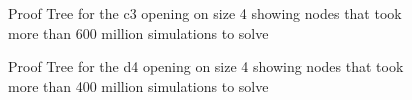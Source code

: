 \begin{figure}
\centering

\caption{Proof Tree for the c3 opening on size 4 showing nodes that took more than 600 million simulations to solve}
\label{fig:proof-c3}
\end{figure}

\begin{figure}
\centering

\caption{Proof Tree for the d4 opening on size 4 showing nodes that took more than 400 million simulations to solve}
\label{fig:proof-d4}
\end{figure}


